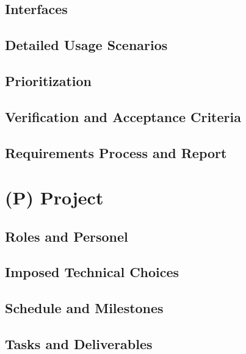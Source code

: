 \documentclass{article}
\begin{document}
\subsection{Interfaces}\label{subsec:interfaces}

\subsection{Detailed Usage Scenarios}\label{subsec:detailed-usage-scenarios}

\subsection{Prioritization}\label{subsec:prioritization}

\subsection{Verification and Acceptance Criteria}\label{subsec:verification-and-acceptance-criteria}

\subsection{Requirements Process and Report}\label{subsec:requirements-process-and-report}

\newpage{}


\section*{(P) Project}\label{sec:srs_project}
\renewcommand{\thesubsection}{P.\arabic{subsection}}
\setcounter{subsection}{0}

\subsection{Roles and Personel}

\subsection{Imposed Technical Choices}

\subsection{Schedule and Milestones}

\subsection{Tasks and Deliverables}
\end{document}
